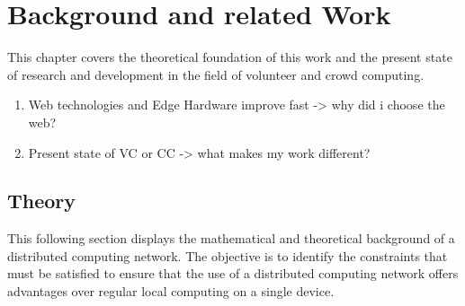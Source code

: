 \chapter{Background and related Work}
\label{ch:background}
This chapter covers the theoretical foundation of this work and the present state of research and development in the field of volunteer and crowd computing.

\begin{enumerate}
  \item Web technologies and Edge Hardware improve fast -> why did i choose the web?
  \item Present state of VC or CC -> what makes my work different?
\end{enumerate}

\section{Theory}
\label{sec:background:theory}
This following section displays the mathematical and theoretical background of a distributed computing network. The objective is to identify the constraints that must be satisfied to ensure that the use of a distributed computing network offers advantages over regular local computing on a single device.

